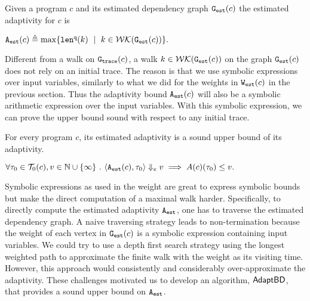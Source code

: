\begin{defn}
\label{def:prog_adapt}
{
Given a program ${c}$ and its estimated dependency graph 
$\mathtt{{G_{est}}}({c})$
the estimated adaptivity for $c$ is 
\begin{center}
$
\progA({c})
\triangleq \max
\left\{ \qlen(k) \ \mid \  k \in \walks(\progG(c))\right \}.
$
\end{center}
}
\end{defn}



Different from a walk on $\mathtt{{G_{trace}}}(c)$, a walk $k \in \mathcal{WK}(\mathtt{{G_{est}}}(c))$ on the graph $\mathtt{{G_{est}}}(c)$
 does not rely on an initial trace. 
 The reason is that we use symbolic expressions over input variables, similarly to what we did for the weights in $\mathtt{{W_{est}}}(c)$ in the previous section. Thus the adaptivity bound ${\mathtt{A_{est}}}(c)$ will also be a symbolic arithmetic expression over the input variables. With this symbolic expression, we can prove the upper bound sound with respect to any initial trace. 

%
\begin{thm}
    \label{thm:sound_progadapt}
    For every program $c$, 
    its estimated adaptivity is a sound upper bound of its adaptivity.
\begin{center}
$
     \forall \mathtt{\tau}_0 \in \mathcal{T}_{0}(c), v \in \mathbb{N}\cup \{\infty\} ~.~ 
\langle {\ensuremath{\mathtt{A_{est}}}}(c), \mathtt{\tau}_0 \rangle \Downarrow_e v \implies A(c)(\mathtt{\tau}_0) \leq v.
$
\end{center}
\end{thm}

Symbolic expressions as used in the weight are great to express symbolic bounds but make the direct computation of 
a maximal walk harder. Specifically, to directly compute the estimated adaptivity ${\mathtt{A_{est}}}$,
one has to traverse the estimated dependency graph.
A naive traversing strategy leads to non-termination
because the weight of each vertex in $\mathtt{{G_{est}}}({c})$
is a symbolic expression containing input variables.
We could try to use a depth first search strategy
using the longest weighted path to approximate
the finite walk with the weight as
its visiting time. However, this approach would  consistently and considerably over-approximate the adaptivity. These challenges 
motivated us to develop an algorithm,   $\mathsf{AdaptBD}$,  that provides a sound upper bound 
on ${\mathtt{A_{est}}}$. 

